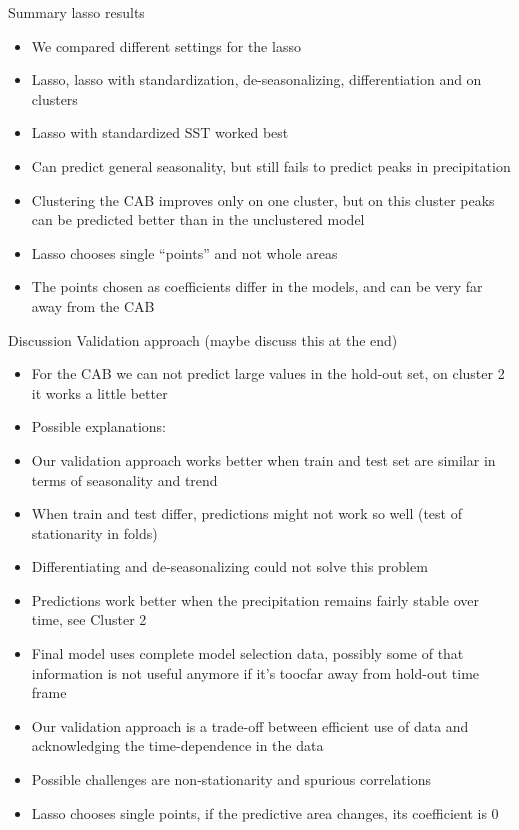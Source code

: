 \documentclass[
  ignorenonframetext,
]{beamer}
\providecommand{\tightlist}{%
  \setlength{\itemsep}{0pt}\setlength{\parskip}{0pt}}
\begin{document}
\begin{frame}{Summary lasso results}
\protect\hypertarget{summary-lasso-results}{}
\begin{itemize}
\tightlist
\item
  We compared different settings for the lasso
\item
  Lasso, lasso with standardization, de-seasonalizing, differentiation
  and on clusters
\item
  Lasso with standardized SST worked best
\item
  Can predict general seasonality, but still fails to predict peaks in
  precipitation
\item
  Clustering the CAB improves only on one cluster, but on this cluster
  peaks can be predicted better than in the unclustered model
\item
  Lasso chooses single ``points'' and not whole areas
\item
  The points chosen as coefficients differ in the models, and can be
  very far away from the CAB
\end{itemize}
\end{frame}

\begin{frame}{Discussion Validation approach (maybe discuss this at the
end)}
\protect\hypertarget{discussion-validation-approach-maybe-discuss-this-at-the-end}{}
\begin{itemize}
\tightlist
\item
  For the CAB we can not predict large values in the hold-out set, on
  cluster 2 it works a little better
\item
  Possible explanations:
\item
  Our validation approach works better when train and test set are
  similar in terms of seasonality and trend
\item
  When train and test differ, predictions might not work so well (test
  of stationarity in folds)
\item
  Differentiating and de-seasonalizing could not solve this problem
\item
  Predictions work better when the precipitation remains fairly stable
  over time, see Cluster 2
\item
  Final model uses complete model selection data, possibly some of that
  information is not useful anymore if it's toocfar away from hold-out
  time frame
\item
  Our validation approach is a trade-off between efficient use of data
  and acknowledging the time-dependence in the data
\item
  Possible challenges are non-stationarity and spurious correlations
\item
  Lasso chooses single points, if the predictive area changes, its
  coefficient is 0
\end{itemize}
\end{frame}
\end{document}
